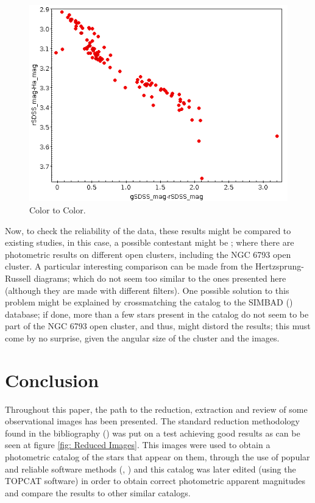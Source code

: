\documentclass{aa}
\begin{document}
    \begin{figure}[H]
        \centering
        \includegraphics[width=0.8\linewidth]{Images/HRdiagram_rgH.png}
        \caption{Color to Color.}
        \label{fig:my_label}
    \end{figure}
    
    Now, to check the reliability of the data, these results might be compared to existing studies, in this case, a possible contestant might be \cite{ClustersPaper}; where there are photometric results on different open clusters, including the NGC 6793 open cluster. A particular interesting comparison can be made from the Hertzsprung-Russell diagrams; which do not seem too similar to the ones presented here (although they are made with different filters). One possible solution to this problem might be explained by crossmatching the catalog to the SIMBAD (\cite{SIMBAD}) database; if done, more than a few stars present in the catalog do not seem to be part of the NGC 6793 open cluster, and thus, might distord the results; this must come by no surprise, given the angular size of the cluster and the images.
    \section{Conclusion}\label{sec: Conclusion}
    Throughout this paper, the path to the reduction, extraction and review of some observational images has been presented. The standard reduction methodology found in the bibliography (\cite{CCD_Guide}) was put on a test achieving good results as can be seen at figure \ref{fig: Reduced Images}. This images were used to obtain a photometric catalog of the stars that appear on them, through the use of popular and reliable software methods (\cite{SExtractor}, \cite{Astrometry}) and this catalog was later edited (using the TOPCAT \cite{TOPCAT} software) in order to obtain correct photometric apparent magnitudes and compare the results to other similar catalogs.
\end{document}
